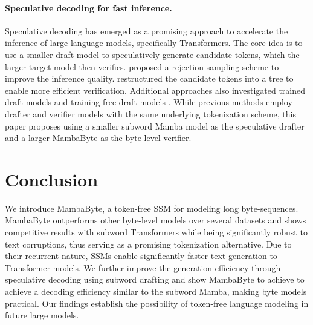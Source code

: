 \paragraph{Speculative decoding for fast inference.} Speculative decoding \citep{spector2023accelerating,leviathan2023fast,chen2023accelerating,xia2023speculative} has emerged as a promising approach to accelerate the inference of large language models, specifically Transformers. The core idea is to use a smaller draft model to speculatively generate candidate tokens, which the larger target model then verifies. \citet{leviathan2023fast,chen2023accelerating} proposed a rejection sampling scheme to improve the inference quality. \citet{spector2023accelerating} restructured the candidate tokens into a tree to enable more efficient verification. Additional approaches also investigated trained draft models \citep{bhendawade2024speculative,chen2023cascade,liu2023online} and training-free draft models \citep{he2023rest,yang2023inference,fu2024break}. While previous methods employ drafter and verifier models with the same underlying tokenization scheme, this paper proposes using a smaller subword Mamba model as the speculative drafter and a larger MambaByte as the byte-level verifier.

\section{Conclusion}
\label{sec:concl}

We introduce MambaByte, a token-free SSM for modeling long byte-sequences. MambaByte outperforms other byte-level models over several datasets and shows competitive results with subword Transformers while being significantly robust to text corruptions, thus serving as a promising tokenization alternative. Due to their recurrent nature, SSMs enable significantly faster text generation to Transformer models. We further improve the generation efficiency through speculative decoding using subword drafting and show MambaByte to achieve to achieve a decoding efficiency similar to the subword Mamba, making byte models practical. Our findings establish the possibility of token-free language modeling in future large models.

\ifauthorinfo


